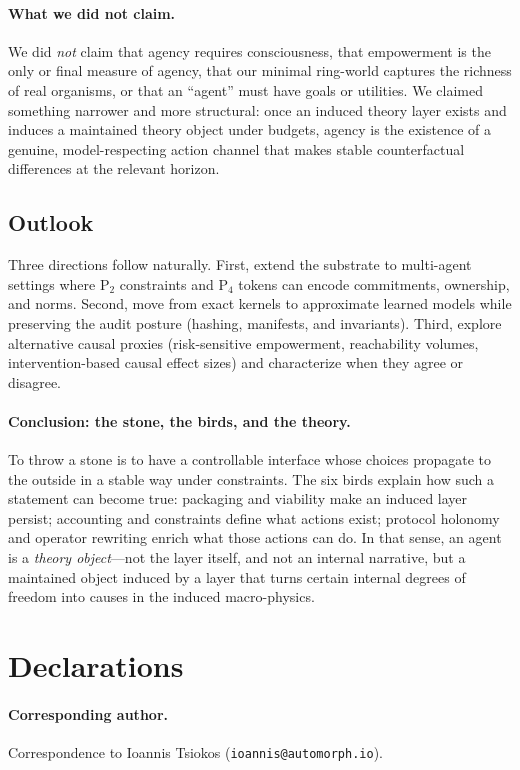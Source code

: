 \documentclass[11pt]{article}
\begin{document}
\paragraph{What we did not claim.}
We did \emph{not} claim that agency requires consciousness, that empowerment is the only or final measure of agency, that our minimal ring-world captures the richness of real organisms, or that an ``agent'' must have goals or utilities. We claimed something narrower and more structural: once an induced theory layer exists and induces a maintained theory object under budgets, agency is the existence of a genuine, model-respecting action channel that makes stable counterfactual differences at the relevant horizon.

\subsection{Outlook}
Three directions follow naturally. First, extend the substrate to multi-agent settings where P$_2$ constraints and P$_4$ tokens can encode commitments, ownership, and norms. Second, move from exact kernels to approximate learned models while preserving the audit posture (hashing, manifests, and invariants). Third, explore alternative causal proxies (risk-sensitive empowerment, reachability volumes, intervention-based causal effect sizes) and characterize when they agree or disagree.

\paragraph{Conclusion: the stone, the birds, and the theory.}
To throw a stone is to have a controllable interface whose choices propagate to the outside in a stable way under constraints. The six birds explain how such a statement can become true: packaging and viability make an induced layer persist; accounting and constraints define what actions exist; protocol holonomy and operator rewriting enrich what those actions can do. In that sense, an agent is a \emph{theory object}---not the layer itself, and not an internal narrative, but a maintained object induced by a layer that turns certain internal degrees of freedom into causes in the induced macro-physics.

\section*{Declarations}

\paragraph{Corresponding author.}
Correspondence to Ioannis Tsiokos (\texttt{ioannis@automorph.io}).
\end{document}
